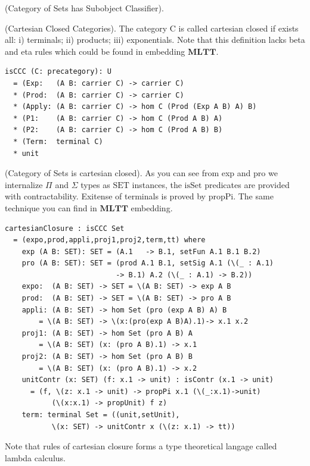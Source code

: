 \begin{theorem} (Category of Sets has Subobject Classifier).
\end{theorem}

\begin{definition} (Cartesian Closed Categories).
The category $\mathrm{C}$ is called cartesian closed if exists all:
i) terminals; ii) products; iii) exponentials. Note that this definition
lacks beta and eta rules which could be found in embedding $\mathbf{MLTT}$.
\begin{lstlisting}
isCCC (C: precategory): U
  = (Exp:   (A B: carrier C) -> carrier C)
  * (Prod:  (A B: carrier C) -> carrier C)
  * (Apply: (A B: carrier C) -> hom C (Prod (Exp A B) A) B)
  * (P1:    (A B: carrier C) -> hom C (Prod A B) A)
  * (P2:    (A B: carrier C) -> hom C (Prod A B) B)
  * (Term:  terminal C)
  * unit
\end{lstlisting}
\end{definition}

\begin{theorem} (Category of Sets is cartesian closed).
As you can see from exp and pro we internalize $\Pi$ and $\Sigma$ types as $\mathrm{SET}$ instances,
the $\mathrm{isSet}$ predicates are provided with contractability.
Exitense of terminals is proved by $\mathrm{propPi}$. The same technique you
can find in $\mathbf{MLTT}$ embedding.
\begin{lstlisting}
cartesianClosure : isCCC Set
  = (expo,prod,appli,proj1,proj2,term,tt) where
    exp (A B: SET): SET = (A.1   -> B.1, setFun A.1 B.1 B.2)
    pro (A B: SET): SET = (prod A.1 B.1, setSig A.1 (\(_ : A.1)
                          -> B.1) A.2 (\(_ : A.1) -> B.2))
    expo:  (A B: SET) -> SET = \(A B: SET) -> exp A B
    prod:  (A B: SET) -> SET = \(A B: SET) -> pro A B
    appli: (A B: SET) -> hom Set (pro (exp A B) A) B
        = \(A B: SET) -> \(x:(pro(exp A B)A).1)-> x.1 x.2
    proj1: (A B: SET) -> hom Set (pro A B) A
        = \(A B: SET) (x: (pro A B).1) -> x.1
    proj2: (A B: SET) -> hom Set (pro A B) B
        = \(A B: SET) (x: (pro A B).1) -> x.2
    unitContr (x: SET) (f: x.1 -> unit) : isContr (x.1 -> unit)
      = (f, \(z: x.1 -> unit) -> propPi x.1 (\(_:x.1)->unit)
           (\(x:x.1) -> propUnit) f z)
    term: terminal Set = ((unit,setUnit),
           \(x: SET) -> unitContr x (\(z: x.1) -> tt))
\end{lstlisting}
Note that rules of cartesian closure forms a type theoretical langage
called lambda calculus.
\end{theorem}

